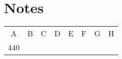 \section{Notes}
\begin{tabular}{ c c c c c c c c }
	A & B & C & D & E & F & G & H \\
	440
\end{tabular}
